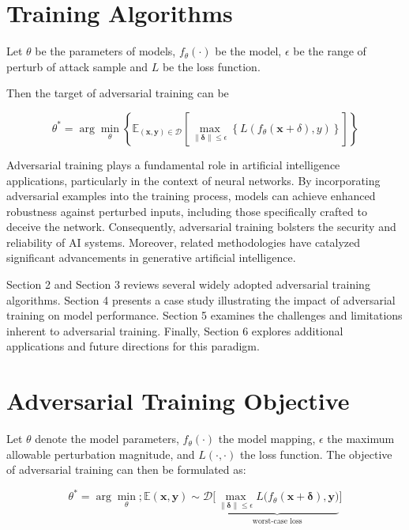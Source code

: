 \documentclass[10pt,twocolumn,letterpaper]{article}
\begin{document}
\section{Training Algorithms}
Let $\theta$ be the parameters of models, $f_\theta(\cdot)$ be the model, $\epsilon$ be the range of perturb of attack sample and $L$ be the loss function.

Then the target of adversarial training can be

\begin{equation}
\theta^*=\arg\min_\theta\left\{
  \mathbb{E}_{(\mathbf{x}, \mathbf{y})\in \mathcal{D}}
  \left[
      \max_{\lVert\mathbf{\delta}\rVert\leq \epsilon}
          \left\{L(f_\theta(\mathbf{x}+\delta), y)\right\}
  \right]
\right\}
\tag{2:1}
\label{formula:adversarial_target}
\end{equation}

Adversarial training plays a fundamental role in artificial intelligence applications, particularly in the context of neural networks. By incorporating adversarial examples into the training process, models can achieve enhanced robustness against perturbed inputs, including those specifically crafted to deceive the network. Consequently, adversarial training bolsters the security and reliability of AI systems. Moreover, related methodologies have catalyzed significant advancements in generative artificial intelligence.

Section 2 and Section 3 reviews several widely adopted adversarial training algorithms. Section 4 presents a case study illustrating the impact of adversarial training on model performance. Section 5 examines the challenges and limitations inherent to adversarial training. Finally, Section 6 explores additional applications and future directions for this paradigm.

\section{Adversarial Training Objective}
Let $\theta$ denote the model parameters, $f_{\theta}(\cdot)$ the model mapping, $\epsilon$ the maximum allowable perturbation magnitude, and $L(\cdot,\cdot)$ the loss function. The objective of adversarial training can then be formulated as:

\begin{equation}
\theta^{*} = \arg\min_{\theta} ; \mathbb{E}{(\mathbf{x},\mathbf{y}) \sim \mathcal{D}} \Biggl[\underbrace{\max_{{\lVert \mathbf{\delta} \rVert \le \epsilon}} L\bigl(f_{\theta}(\mathbf{x} + \mathbf{\delta}), \mathbf{y}\bigr)}_{\text{worst-case loss}}\Biggr]
\label{eq:adv_training_objective}
\end{equation}
\end{document}
